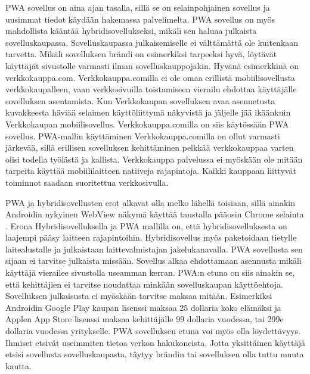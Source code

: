 \documentclass{tktltiki}
\begin{document}
PWA sovellus on aina ajan tasalla, sillä se on selainpohjainen sovellus ja uusimmat tiedot käydään hakemassa palvelimelta. PWA sovellus on myös mahdollista kääntää hybridisovellukseksi, mikäli sen haluaa julkaista sovelluskaupassa. Sovelluskaupassa julkaisemiselle ei välttämättä ole kuitenkaan tarvetta. Mikäli sovelluksen brändi on esimerkiksi tarpeeksi hyvä, löytävät käyttäjät sivustolle varmasti ilman sovelluskauppojakin. Hyvänä esimerkkinä on verkkokauppa.com. Verkkokauppa.comilla ei ole omaa erillistä mobiilisovellusta verkkokaupalleen, vaan verkkosivuilla toistamiseen vierailu ehdottaa käyttäjälle sovelluksen asentamista. Kun Verkkokaupan sovelluksen avaa asennetusta kuvakkeesta häviää selaimen käyttöliittymä näkyvistä ja jäljelle jää ikäänkuin Verkkokaupan mobiilisovellus. Verkkokauppa.comilla on siis käytössään PWA sovellus. PWA-mallin käyttäminen Verkkokauppa.comilla on ollut varmasti järkevää, sillä erillisen sovelluksen kehittäminen pelkkää verkkokauppaa varten olisi todella työlästä ja kallista. Verkkokauppa palvelussa ei myöskään ole mitään tarpeita käyttää mobiililaitteen natiiveja rajapintoja. Kaikki kauppaan liittyvät toiminnot saadaan suoritettua verkkosivulla.

PWA ja hybridisovellusten erot alkavat olla melko lähellä toisiaan, sillä ainakin Androidin nykyinen WebView näkymä käyttää taustalla pääosin Chrome selainta \cite{Crosswalk}. Erona Hybridisovelluksella ja PWA mallilla on, että hybridisovelluksesta on laajempi pääsy laitteen rajapintoihin. Hybridisovellus myös paketoidaan tietylle laitealustalle ja julkaistaan laittevalmistajan jakelukanavalla. PWA sovellusta sen sijaan ei tarvitse julkaista missään. Sovellus alkaa ehdottamaan asennusta mikäli käyttäjä vierailee sivustolla useamman kerran. PWA:n etuna on siis ainakin se, että kehittäjien ei tarvitse noudattaa minkään sovelluskaupan käyttöehtoja. Sovelluksen julkaisusta ei myöskään tarvitse maksaa mitään. Esimerkiksi Androidin Google Play kaupan lisenssi maksaa 25 dollaria koko elämäksi ja Applen App Store lisenssi maksaa kehittäjälle 99 dollaria vuodessa, tai 299e dollaria vuodessa yritykselle. PWA sovelluksen etuna voi myös olla löydettävyys. Ihmiset etsivät useimmiten tietoa verkon hakukoneista. Jotta yksittäinen käyttäjä etsisi sovellusta sovelluskaupasta, täytyy brändin tai sovelluksen olla tuttu muuta kautta. 
\end{document}

